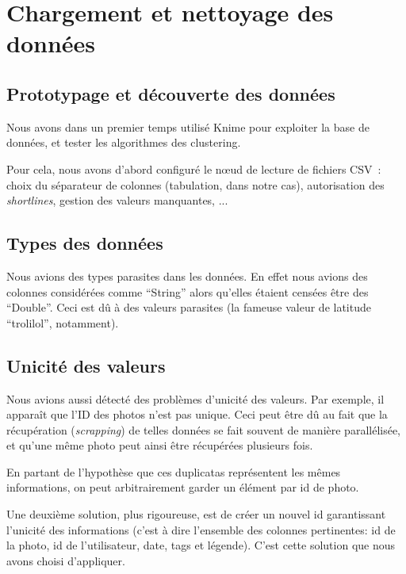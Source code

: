 \chapter{Chargement et nettoyage des données}

\section{Prototypage et découverte des données}
    Nous avons dans un premier temps utilisé Knime pour exploiter la base de données,
    et tester les algorithmes des clustering.

    Pour cela, nous avons d'abord configuré le nœud de lecture de fichiers CSV~: choix du
    séparateur de colonnes (tabulation, dans notre cas), autorisation des \textit{shortlines},
    gestion des valeurs manquantes, ...

\section{Types des données}
    Nous avions des types parasites dans les données. En effet nous
    avions des colonnes considérées comme ``String'' alors qu'elles étaient
    censées être des ``Double''. Ceci est dû à des valeurs parasites (la fameuse
    valeur de latitude ``trolilol'', notamment).

\section{Unicité des valeurs}
    Nous avions aussi détecté des problèmes d'unicité des valeurs. Par
    exemple, il apparaît que l'ID des photos n'est pas unique.
    Ceci peut être dû au fait que la récupération (\textit{scrapping}) de telles données
    se fait souvent de manière parallélisée, et qu'une même photo peut ainsi être récupérées plusieurs fois.

    En partant de l'hypothèse que ces duplicatas représentent les mêmes
    informations, on peut arbitrairement garder un élément par id de photo.

    Une deuxième solution, plus rigoureuse, est de créer un nouvel id garantissant
    l'unicité des informations (c'est à dire l'ensemble des colonnes pertinentes: id de
    la photo, id de l'utilisateur, date, tags et légende). C'est cette solution que nous avons choisi d'appliquer.

